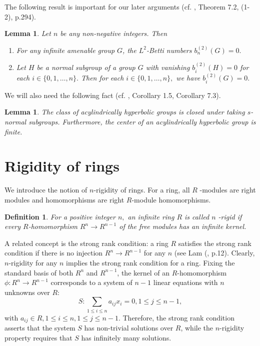 \documentclass{gtpart}     %
\newtheorem{definition}[theorem]{Definition}
\newtheorem{lemma}[theorem]{Lemma}
\begin{document}
\bigskip The following result is important for our later arguments (cf. \cite%
{lu}, Theorem 7.2, (1-2), p.294).

\begin{lemma}
\label{lem2}Let $n$ be any non-negative integers. Then

\begin{enumerate}
\item[(i)] For any infinite amenable group $G$, the $L^{2}$-Betti numbers $%
b_{n}^{(2)}(G)=0.$

\item[(ii)] Let $H$ be a normal subgroup of a group $G$ with vanishing $%
b_{i}^{(2)}(H)=0$ for each $i\in \{0,1,\ldots ,n\}.$ Then for each $i\in
\{0,1,\ldots ,n\},$ we have $b_{i}^{(2)}(G)=0.$
\end{enumerate}
\end{lemma}

We will also need the following fact (cf. \cite{Os}, Corollary 1.5,
Corollary 7.3).

\begin{lemma}
\label{lem3}The class of acylindrically hyperbolic groups is closed under
taking $s$-normal subgroups. Furthermore, the center of an acylindrically
hyperbolic group is finite.
\end{lemma}

\section{Rigidity of rings\label{sec}}

We introduce the notion of $n$-rigidity of rings. For a ring, all $R$%
-modules are right modules and homomorphisms are right $R$-module
homomorphisms.

\begin{definition}
\label{de}For a positive integer $n,$ an infinite ring $R$ is called $n$%
\emph{-rigid} if every $R$-homomorphism $R^{n}\rightarrow R^{n-1}$ of the
free modules has an infinite kernel.
\end{definition}

A related concept is the strong rank condition: a ring $R$ satisfies the
strong rank condition if there is no injection $R^{n}\rightarrow R^{n-1}$
for any $n$ (see Lam (\cite{la}, p.12). Clearly, $n$-rigidity for any $n$
implies the strong rank condition for a ring. Fixing the standard basis of
both $R^{n}$ and $R^{n-1}$, the kernel of an $R$-homomorphism $\phi
:R^{n}\rightarrow R^{n-1}$ corresponds to a system of $n-1$ linear equations
with $n$ unknowns over $R$:
\begin{equation*}
S:\sum_{1\leq i\leq n}a_{ij}x_{i}=0,1\leq j\leq n-1,
\end{equation*}%
with $a_{ij}\in R,1\leq i\leq n,1\leq j\leq n-1.$ Therefore, the strong rank
condition asserts that the system $S$ has non-trivial solutions over $R$,
while the $n$-rigidity property requires that $S$ has infinitely many
solutions.
\end{document}
